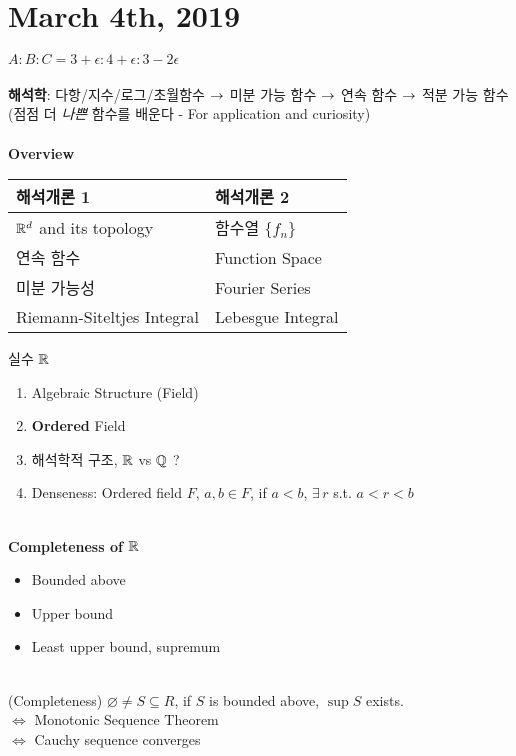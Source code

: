 \section*{March 4th, 2019}
$A:B:C = 3+\epsilon : 4 +\epsilon : 3-2\epsilon$\\\\
\textbf{해석학}:
다항/지수/로그/초월함수 $\rightarrow$ 미분 가능 함수 $\rightarrow$ 연속 함수 $\rightarrow$ 적분 가능 함수
(점점 더 \textit{나쁜} 함수를 배운다 - For application and curiosity)\\\\
\textbf{Overview}
\begin{center}
	\begin{tabular}[c]{|p{7cm}|p{7cm}|}
		\hline
		\textbf{해석개론 1} & \textbf{해석개론 2} \\ \hline
		$\mathbb{R}^d$ and its topology & 함수열 $\{f_n\}$ \\ \hline
		연속 함수 & Function Space \\ \hline
		미분 가능성 & Fourier Series \\ \hline
		Riemann-Siteltjes Integral & Lebesgue Integral \\\hline
	\end{tabular}
\end{center}
실수 $\mathbb{R}$
\begin{enumerate}
	\item Algebraic Structure (Field)
	\item \textbf{Ordered} Field
	\item 해석학적 구조, $\mathbb{R}$ vs $\mathbb{Q}$ ?
	\item Denseness: Ordered field $F$, $a, b\in F$, if $a<b$, $\exists\, r$ s.t. $a<r<b$
\end{enumerate}~\\
\textbf{Completeness of $\mathbb{R}$}
\begin{itemize}
	\item Bounded above
	\item Upper bound
	\item Least upper bound, supremum
\end{itemize}~\\
(Completeness) $\varnothing \neq S\subseteq R$, if $S$ is bounded above, $\sup S$ exists.\\
$\iff$ Monotonic Sequence Theorem\\
$\iff$ Cauchy sequence converges
\pagebreak